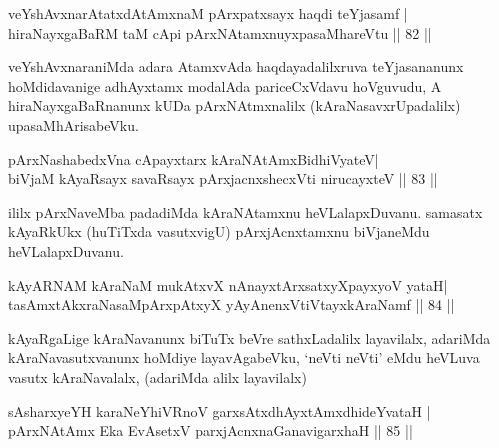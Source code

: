 
\begin{shl}
veYshAvxnarAtatxdAtAmxnaM pArxpatxsayx haqdi teYjasamf |\\
hiraNayxgaBaRM taM cApi pArxNAtamxnuyxpasaMhareVtu \hfill || 82 || 
\end{shl}

\begin{artha}
veYshAvxnaraniMda adara AtamxvAda haqdayadalilxruva teYjasananunx hoMdidavanige adhAyxtamx modalAda pariceCxVdavu hoVguvudu, A hiraNayxgaBaRnanunx kUDa pArxNAtmxnalilx (kAraNasavxrUpadalilx) upasaMhArisabeVku.
\end{artha}


\begin{shl}
pArxNashabedxVna cApayxtarx kAraNAtAmx\s BidhiVyateV|\\
biVjaM kAyaRsayx savaRsayx pArxjacnxshecxVti nirucayxteV \hfill || 83 || 
\end{shl}

\begin{artha}
ililx pArxNaveMba padadiMda kAraNAtamxnu heVLalapxDuvanu. samasatx kAyaRkUkx (huTiTxda vasutxvigU) pArxjAcnxtamxnu biVjaneMdu heVLalapxDuvanu.
\end{artha}


\begin{shl}
kAyARNAM kAraNaM mukAtxvX nAnayxtArxsatxyXpayxyoV yataH|\\
tasAmxtAkxraNasaMpArxpAtxyX yAyAnenxVtiVtayxkAraNamf \hfill || 84 || 
\end{shl}

\begin{artha}
kAyaRgaLige kAraNavanunx biTuTx beVre sathxLadalilx layavilalx, adariMda kAraNavasutxvanunx hoMdiye layavAgabeVku, `neVti neVti' eMdu heVLuva vasutx kAraNavalalx, (adariMda alilx layavilalx)
\end{artha}


\begin{shl}
sAsharxyeYH karaNeYhiVRnoV garxsAtxdhAyxtAmxdhideYvataH |\\
pArxNAtAmx Eka EvA\s \s setxV parxjAcnxnaGanavigarxhaH \hfill || 85 || 
\end{shl}

